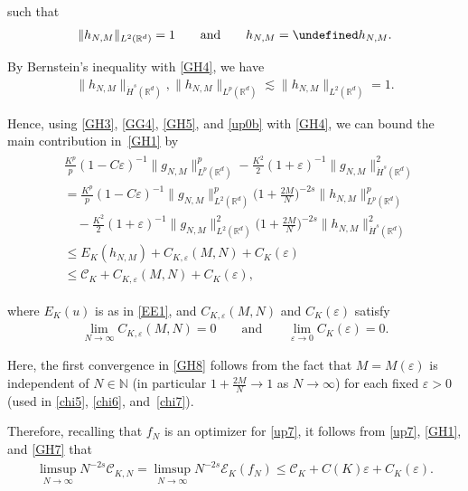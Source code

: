 \documentclass[letterpaper, 11pt,  reqno]{amsart}
\DeclareMathOperator*{\supp}{supp}
\newcommand{\noi}{\noindent}
\newcommand{\R}{\mathbb{R}}
\let\P= \undefined
\newcommand{\P}{\mathbf{P}}
\newcommand{\F}{\mathcal{F}}
\newcommand{\eps}{\varepsilon}
\newcommand{\les}{\lesssim}
\newcommand{\N}{\mathbb{N}}
\newcommand{\EE}{\mathcal{E}}
\numberwithin{equation}{section}
\numberwithin{theorem}{section}
\newcommand{\CC}{\mathcal{C}}
\begin{document}
\noi
such that 
\begin{align}
\| h_{N, M}\|_{L^2(\R^d)} = 1
\qquad \text{and}\qquad 
h_{N,M} = \P h_{N,M}.
\label{GH4}
\end{align}

\noi
By Bernstein's inequality with \eqref{GH4}, we have 
\begin{align}
\|h_{N,M}\|_{\dot H^s (\R^d)}, \|h_{N,M}\|_{L^{p}(\R^d)}
\les \|h_{N,M}\|_{L^{2}(\R^d)}= 1.	
\label{GH5}
\end{align}


\noi
Hence, using
\eqref{GH3},  \eqref{GG4}, 
 \eqref{GH5}, and \eqref{up0b}
 with \eqref{GH4}, 
we can bound 
the main contribution in~\eqref{GH1} by 
\begin{align}
\begin{split}
&\frac{K^p}{p}(1-C\eps)^{-1}\|g_{N,M}\|^p_{L^{p}(\R^d)}
-\frac{K^2}{2}(1+\eps)^{-1}\| g_{N,M}\|^2_{\dot H^{s}(\R^d)}\\
&=\frac{K^p}{p}(1-C\eps)^{-1}\|g_{N,M}\|^{p}_{L^{2}(\R^d)}
\bigg(1+\frac{2M}{N}\bigg)^{-2s}\|h_{N,M}\|^p_{L^{p}(\R^d)}\\
&\quad
-\frac{K^2}{2}(1+\eps)^{-1}
\|g_{N,M}\|^{2}_{L^{2}(\R^d)}
\bigg(1+\frac{2M}{N}\bigg)^{-2s}\| h_{N,M}\|^2_{\dot H^{s}(\R^d)}\\
& \le E_K(h_{N, M})
+  C_{K, \eps}(M, N)
+ C_K(\eps)\\
& \le \CC_K 
+  C_{K, \eps}(M, N)
+ C_K(\eps), 
\end{split}
\label{GH7}
\end{align}



\noi
where $E_K(u)$ is as in \eqref{EE1}, 
and 
$C_{K, \eps}(M, N)$
and
$C_K(\eps)$ satisfy 
\begin{align}
\lim_{N \to \infty} C_{K, \eps}(M, N) = 0
\qquad \text{and} \qquad \lim_{\eps \to 0} C_K(\eps) = 0.
\label{GH8}
\end{align}


\noi
Here, the first convergence in \eqref{GH8}
follows from the fact that 
 $M = M(\eps)$ is independent of $N \in \N$
 (in particular $1 + \frac{2M}{N} \to 1$ as $N \to \infty$)
 for each fixed $\eps > 0$ 
(used in \eqref{chi5}, \eqref{chi6}, and~\eqref{chi7}).




 

Therefore, recalling that 
$f_N$ is an optimizer for \eqref{up7}, 
it follows from 
\eqref{up7}, 
 \eqref{GH1},  and \eqref{GH7} 
 that 
\begin{align*}
\limsup_{N\to \infty} N^{-2s}\CC_{K,N}
 = \limsup_{N\to \infty}
 N^{-2s}
  \EE_K(f_N)
\le 
\CC_K + 
C(K) \eps+ 
C_K(\eps).
\end{align*}
\end{document}
